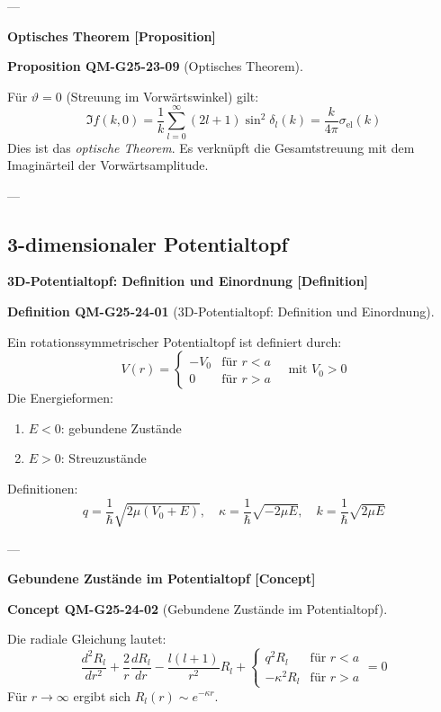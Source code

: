 \documentclass[10pt, letterpaper]{article}
\newcommand{\CustomHeading}[3]{%
  \par\medskip\noindent%
  \textbf{#1 #2} \textnormal{(#3)}.\enskip%
}
\newenvironment{DEF}[2]{\begin{unitbox}\CustomHeading{Definition}{#1}{#2}}{\end{unitbox}}
\newenvironment{PROP}[2]{\begin{unitbox}\CustomHeading{Proposition}{#1}{#2}}{\end{unitbox}}
\newenvironment{CONC}[2]{\begin{unitbox}\CustomHeading{Concept}{#1}{#2}}{\end{unitbox}}
\begin{document}
---

\textbf{Optisches Theorem [Proposition]}

\begin{PROP}{QM-G25-23-09}{Optisches Theorem}
Für $\vartheta = 0$ (Streuung im Vorwärtswinkel) gilt:
\[
\Im f(k, 0) = \frac{1}{k} \sum_{l=0}^\infty (2l+1) \sin^2 \delta_l(k)
= \frac{k}{4\pi} \sigma_{\text{el}}(k)
\]
Dies ist das \emph{optische Theorem}. Es verknüpft die Gesamtstreuung mit dem Imaginärteil der Vorwärtsamplitude.
\end{PROP}

---


\pagebreak


\subsection{3-dimensionaler Potentialtopf}

\textbf{3D-Potentialtopf: Definition und Einordnung [Definition]}

\begin{DEF}{QM-G25-24-01}{3D-Potentialtopf: Definition und Einordnung}
Ein rotationssymmetrischer Potentialtopf ist definiert durch:
\[
V(r) = \begin{cases}
-V_0 & \text{für } r < a \\
0    & \text{für } r > a
\end{cases}
\quad \text{mit } V_0 > 0
\]
Die Energieformen:
\begin{enumerate}
  \item $E < 0$: gebundene Zustände
  \item $E > 0$: Streuzustände
\end{enumerate}
Definitionen:
\[
q = \frac{1}{\hbar} \sqrt{2\mu(V_0 + E)}, \quad
\kappa = \frac{1}{\hbar} \sqrt{-2\mu E}, \quad
k = \frac{1}{\hbar} \sqrt{2\mu E}
\]
\end{DEF}

---

\textbf{Gebundene Zustände im Potentialtopf [Concept]}

\begin{CONC}{QM-G25-24-02}{Gebundene Zustände im Potentialtopf}
Die radiale Gleichung lautet:
\[
\frac{d^2 R_l}{dr^2} + \frac{2}{r} \frac{dR_l}{dr} - \frac{l(l+1)}{r^2} R_l + 
\begin{cases}
q^2 R_l & \text{für } r < a \\
-\kappa^2 R_l & \text{für } r > a
\end{cases}
= 0
\]
Für $r \to \infty$ ergibt sich $R_l(r) \sim e^{-\kappa r}$.
\end{CONC}
\end{document}
